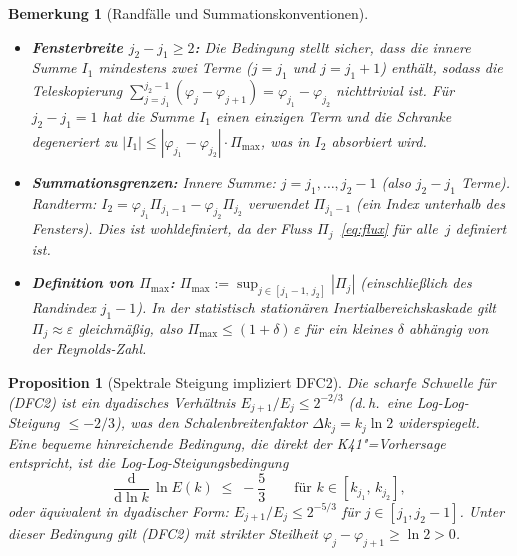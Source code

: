 \documentclass[12pt,a4paper]{article}
\theoremstyle{breakdef}
\theoremstyle{breakplain}
\newtheorem{proposition}[definition]{Proposition}
\theoremstyle{breakdef}
\newtheorem{remark}[definition]{Bemerkung}
\begin{document}
\begin{remark}[Randfälle und Summationskonventionen]
\label{rem:edge-cases}
\mbox{}
\begin{itemize}
  \item \textbf{Fensterbreite $j_2 - j_1 \ge 2$:}\quad
    Die Bedingung stellt sicher, dass die innere Summe $I_1$ mindestens
    zwei Terme ($j = j_1$ und $j = j_1+1$) enthält, sodass die
    Teleskopierung $\sum_{j=j_1}^{j_2-1}(\varphi_j - \varphi_{j+1}) =
    \varphi_{j_1} - \varphi_{j_2}$ nichttrivial ist. Für $j_2 - j_1 = 1$
    hat die Summe $I_1$ einen einzigen Term und die Schranke degeneriert zu
    $|I_1| \le |\varphi_{j_1}-\varphi_{j_2}|\cdot\Pi_{\max}$, was in
    $I_2$ absorbiert wird.
  \item \textbf{Summationsgrenzen:}\quad
    Innere Summe: $j = j_1, \ldots, j_2-1$ (also $j_2-j_1$ Terme).
    Randterm: $I_2 = \varphi_{j_1}\Pi_{j_1-1} -
    \varphi_{j_2}\Pi_{j_2}$ verwendet $\Pi_{j_1-1}$ (ein Index
    unterhalb des Fensters). Dies ist wohldefiniert, da der Fluss
    $\Pi_j$~\eqref{eq:flux} für alle~$j$ definiert ist.
  \item \textbf{Definition von $\Pi_{\max}$:}\;
    $\Pi_{\max} := \sup_{j \in [j_1-1,\, j_2]} |\Pi_j|$ (einschließlich
    des Randindex $j_1-1$). In der statistisch stationären
    Inertialbereichskaskade gilt $\Pi_j \approx \varepsilon$ gleichmäßig,
    also $\Pi_{\max} \le (1+\delta)\,\varepsilon$ für ein kleines $\delta$
    abhängig von der Reynolds-Zahl.
\end{itemize}
\end{remark}

\begin{proposition}[Spektrale Steigung impliziert DFC2]\label{prop:slope-DFC2}
Die scharfe Schwelle für \textup{(DFC2)} ist ein dyadisches Verhältnis
$E_{j+1}/E_j \le 2^{-2/3}$ (d.\,h.\ eine Log-Log-Steigung $\le -2/3$),
was den Schalenbreitenfaktor $\Delta k_j = k_j \ln 2$ widerspiegelt.
Eine bequeme \emph{hinreichende} Bedingung, die direkt der
K41"=Vorhersage entspricht, ist die \emph{Log-Log-Steigungsbedingung}
\begin{equation}\label{eq:slope-condition}
  \frac{\mathrm{d}}{\mathrm{d}\ln k}\,\ln E(k)
  \;\le\; -\frac{5}{3}
  \qquad \text{für } k \in [k_{j_1},\, k_{j_2}],
\end{equation}
oder äquivalent in dyadischer Form: $E_{j+1}/E_j \le 2^{-5/3}$ für
$j \in [j_1, j_2-1]$. Unter dieser Bedingung gilt \textup{(DFC2)}
mit strikter Steilheit $\varphi_j - \varphi_{j+1} \ge \ln 2 > 0$.
\end{proposition}
\end{document}
